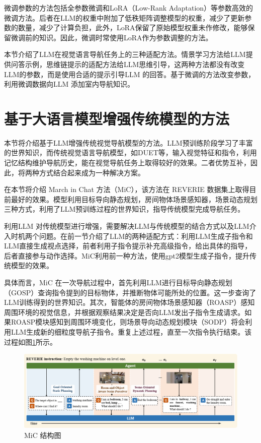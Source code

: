\documentclass[bachelor]{thesis-uestc}
\begin{document}
微调参数的方法包括全参数微调和LoRA（Low-Rank Adaptation）\cite{huLoRALowRankAdaptation2021}等参数高效的微调方法。后者在LLM的权重中附加了低秩矩阵调整模型的权重，减少了更新参数的数量，减少了计算负担，此外，LoRA保留了原始模型权重未作修改，能够保留微调前的知识。因此，微调时常使用LoRA作为参数调整的方法。

本节介绍了LLM在视觉语言导航任务上的三种适配方法。情景学习方法给LLM提供问答示例，思维链提示的适配方法给LLM思维引导，这两种方法都没有改变LLM的参数，而是使用合适的提示引导LLM 的回答。基于微调的方法改变参数，利用微调数据向LLM 添加室内导航知识。

\section{基于大语言模型增强传统模型的方法}

本节将介绍基于LLM增强传统视觉导航模型的方法。LLM预训练阶段学习了丰富的世界知识，而传统视觉语言导航模型，如DUET等，输入视觉特征和指令，利用记忆结构维护导航历史，能在视觉导航任务上取得较好的效果。二者优势互补，因此，将两种方式结合起来成为一种解决方案。

在本节将介绍 March in Chat 方法（MiC）\cite{qiaoMarchChatInteractive2023}，该方法在 REVERIE 数据集上取得目前最好的效果。模型利用目标导向静态规划，房间物体场景感知器，场景动态规划三种方式，利用了LLM预训练过程的世界知识，指导传统模型完成导航任务。

利用LLM 对传统模型进行增强，需要解决LLM与传统模型的结合方式以及LLM介入时机两个问题。在前一节介绍了LLM的两种适配方式：利用LLM生成子指令和LLM直接生成视点选择，前者利用子指令提示补充高级指令，给出具体的指导，后者直接参与动作选择。MiC利用前一种方法，使用gpt2模型生成子指令，提升传统模型的效果。

具体而言，MiC 在一次导航过程中，首先利用LLM进行目标导向静态规划（GOSP）查询指令提到的目标物体，并推断物体可能所处的位置。这一步查询了LLM训练得到的世界知识。其次，智能体的房间物体场景感知器（ROASP）感知周围环境的视觉信息，并根据观察结果决定是否向LLM发出子指令生成请求。如果ROASP模块感知到周围环境变化，则场景导向动态规划模块（SODP）将会利用LLM生成新的细粒度导航子指令。重复上述过程，直至一次指令执行结束。该过程如图\ref{mic}所示。

\begin {figure}[h]
\centering %
\includegraphics[width=\textwidth]{1424-042816.png}
\caption{MiC 结构图} %
\label{mic}
\end {figure}
\end{document}
